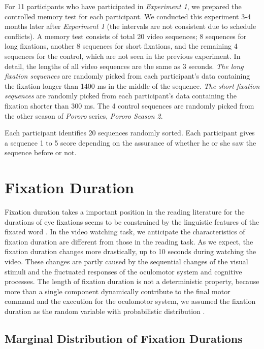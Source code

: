 \documentclass[10pt,letterpaper]{article}
\begin{document}
For 11 participants who have participated in \textit{Experiment 1}, we prepared the controlled memory test for each participant. We conducted this experiment 3-4 months later after \textit{Experiment 1} (the intervals are not consistent due to schedule conflicts). A memory test consists of total 20 video sequences; 8 sequences for long fixations, another 8 sequences for short fixations, and the remaining 4 sequences for the control, which are not seen in the previous experiment. In detail, the lengths of all video sequences are the same as 3 seconds. \textit{The long fixation sequences} are randomly picked from each participant's data containing the fixation longer than 1400 ms in the middle of the sequence. \textit{The short fixation sequences} are randomly picked from each participant's data containing the fixation shorter than 300 ms. The 4 control sequences are randomly picked from the other season of \textit{Pororo} series, \textit{Pororo Season 2}.

Each participant identifies 20 sequences randomly sorted. Each participant gives a sequence 1 to 5 score depending on the assurance of whether he or she saw the sequence before or not. 



\section{Fixation Duration}
\label{sec:fixation-duration}

Fixation duration takes a important position in the reading literature for the durations of eye fixations seems to be constrained by the linguistic features of the fixated word \cite{Rayner1986,Inhoff1986}. In the video watching task, we anticipate the characteristics of fixation duration are different from those in the reading task. As we expect, the fixation duration changes more drastically, up to 10 seconds during watching the video. These changes are partly caused by the sequential changes of the visual stimuli and the fluctuated responses of the oculomotor system and cognitive processes. The length of fixation duration is not a deterministic property, because more than a single component dynamically contribute to the final motor command and the execution for the oculomotor system, we assumed the fixation duration as the random variable with probabilistic distribution \cite{Rayner1998,Reichle2004,Reichle2006}.


\subsection{Marginal Distribution of Fixation Durations}
\end{document}
